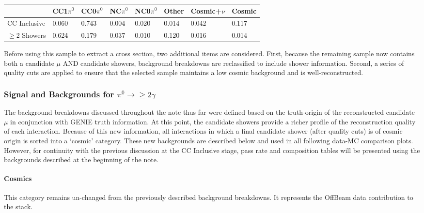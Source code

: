 \begin{table}[H]
\centering
{}
 \begin{tabular}{| l | l | l |l|l|l|l|l|}
 \hline
 & CC1$\pi^0$ & CC0$\pi^0$ & NC$\pi^0$ & NC0$\pi^0$ & Other &Cosmic+$\nu$& Cosmic\\ [0.1ex] \hline
CC Inclusive & 0.060 & 0.743 & 0.004 & 0.020 & 0.014 & 0.042 & 0.117 \\
$\geq$2 Showers & 0.624 & 0.179 & 0.037 & 0.010 & 0.120 & 0.016 & 0.014\\ \hline
\end{tabular}
\end{table}

Before using this sample to extract a cross section, two additional items are considered. First, because the remaining sample now contains both a candidate $\mu$ AND candidate showers, background breakdowns are reclassified to include shower information. Second, a series of quality cuts are applied to ensure that the selected sample maintains a low cosmic background and is well-reconstructed.

\subsubsection{Signal and Backgrounds for $\pi^0\rightarrow\geq 2 \gamma$}
The background breakdowns discussed throughout the note thus far were defined based on the truth-origin of the reconstructed candidate $\mu$ in conjunction with GENIE truth information. At this point, the candidate showers provide a richer profile of the reconstruction quality of each interaction. Because of this new information, all interactions in which a final candidate shower (after quality cuts) is of cosmic origin is sorted into a `cosmic' category. These new backgrounds are described below and used in all following data-MC comparison plots. However, for continuity with the previous discussion at the CC Inclusive stage, pass rate and composition tables will be presented using the backgrounds described at the beginning of the note. 

\paragraph{ Cosmics}
This category remains un-changed from the previously described background breakdowns.  It represents the OffBeam data contribution to the stack. 

